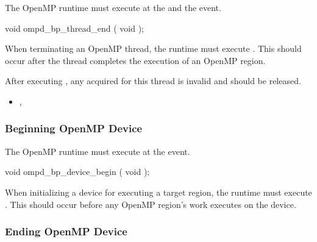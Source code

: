 \summary
The OpenMP runtime must execute 
 at the  and the  event.


\format
\begin{cspecific}
\begin{ompSyntax}
void ompd_bp_thread_end ( void );
\end{ompSyntax}
\end{cspecific}


\descr

When terminating an OpenMP thread, the runtime must 
execute .
This should occur after the thread completes the execution of an OpenMP region.

After 
executing , any  acquired for this thread 
is invalid and should be released.


\crossreferences
\begin{itemize}
\item
  , 
\end{itemize}






\subsubsection{Beginning OpenMP Device}
\label{subsubsec:ompd_bp_device_begin}

\summary
The OpenMP runtime must execute 
 at the  event.


\format
\begin{cspecific}
\begin{ompSyntax}
void ompd_bp_device_begin ( void );
\end{ompSyntax}
\end{cspecific}


\descr

When initializing a device for executing a target region, the runtime must 
execute .
This should occur before any OpenMP region's work executes on the device.






\subsubsection{Ending OpenMP Device}
\label{subsubsec:ompd_bp_device_end}

